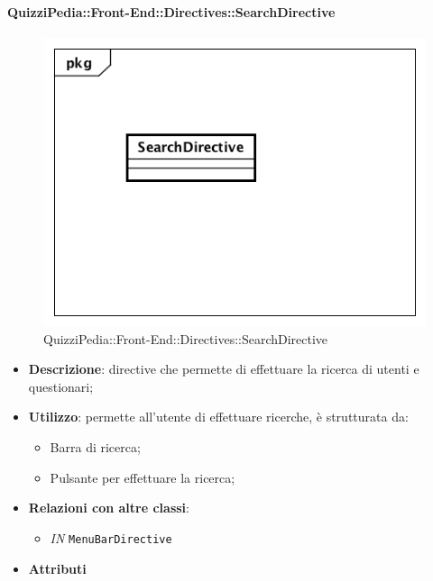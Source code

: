\paragraph{QuizziPedia::Front-End::Directives::SearchDirective}

\label{QuizziPedia::Front-End::Directives::SearchDirective}

\begin{figure}[h]
	\centering
	\includegraphics[scale=0.5,keepaspectratio]{UML/Classi/Front-End/QuizziPedia_Front-end_Directives_SearchDirective.png}
	\caption{QuizziPedia::Front-End::Directives::SearchDirective}
\end{figure}

\begin{itemize}
	\item \textbf{Descrizione}: directive che permette di effettuare la ricerca di utenti e questionari;
	\item \textbf{Utilizzo}: permette all'utente di effettuare ricerche, è strutturata da:
	\begin{itemize}
		\item Barra di ricerca;
		\item Pulsante per effettuare la ricerca;
	\end{itemize}
	\item \textbf{Relazioni con altre classi}:
	\begin{itemize}
		\item \textit{IN} \texttt{MenuBarDirective} 
	\end{itemize}
	\item \textbf{Attributi}
\end{itemize}

